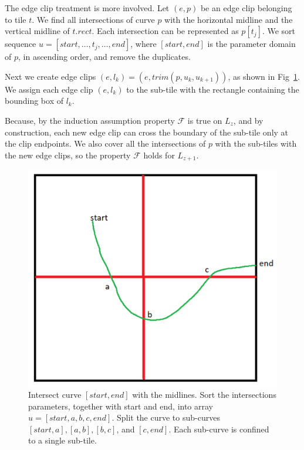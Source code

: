 \documentclass{llncs}
\begin{document}
{The edge clip treatment is more involved. Let $(e, p)$ be an edge clip belonging to tile $t$. We find all intersections of curve $p$ with the horizontal midline and the vertical midline of $t.\textit{rect}$. Each intersection can be represented as $p[t_j]$. We sort sequence $u =[start, \dots, t_j, \dots, end]$, where $[start,end]$ is the parameter domain of $p$, in ascending order, and remove the duplicates.

Next we create edge clips $(e, l_k)=(e, \textit{trim}(p, u_k, u_{k+1}))$, as shown in Fig~\ref{fig:clip}. We assign each edge clip $(e,l_k)$ to the sub-tile with the rectangle containing the bounding box of $l_k$.

Because, by the induction assumption property $\mathcal{F}$ is true on $L_z$, and by construction, each new edge clip can cross the boundary of the sub-tile only at the clip endpoints. We also cover all the intersections of $p$ with the sub-tiles with the new edge clips, so the property $\mathcal{F}$ holds for $L_{z+1}$.
\begin{figure}[!tbp]
  \centering
  \includegraphics[width=\textwidth/2]{./edge_clips.png}
  \caption{Intersect curve $[\textit{start},\textit{end}]$ with the midlines.
  Sort the intersections parameters, together with start and end, into array $u = [\textit{start}, a,b,c, \textit{end}]$. 
  Split the curve to sub-curves $[\textit{start},a], [a,b],[b,c]$, and $[c,\textit{end}]$. Each sub-curve is confined to a single sub-tile.}
  \label{fig:clip}
\end{figure}

}
\end{document}
